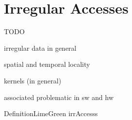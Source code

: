 
\section{Irregular Accesses}
\label{sec:bg:irrAccesses}

TODO

irregular data in general

spatial and temporal locality

kernels (in general)

associated problematic in sw and hw

\begin{highlight}{Definition}{LimeGreen}
    \Glspl{irrAccess}
\end{highlight}